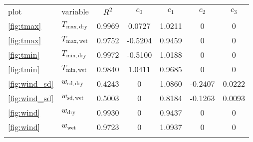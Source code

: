 \begin{tabular}{llccccc}
\tophline
              plot &                          variable &  $R^2$ &   $c_0$ &  $c_1$ &   $c_2$ &  $c_3$ \\
\middlehline
 \ref{fig:tmax} &  $T_{\mathrm{max}, \mathrm{dry}}$ & 0.9969 & 0.0727 & 1.0211 & 0 & 0 \\
 \ref{fig:tmax} &  $T_{\mathrm{max}, \mathrm{wet}}$ & 0.9752 & -0.5204 & 0.9459 & 0 & 0 \\
 \ref{fig:tmin} &  $T_{\mathrm{min}, \mathrm{dry}}$ & 0.9972 & -0.5100 & 1.0188 & 0 & 0 \\
 \ref{fig:tmin} &  $T_{\mathrm{min}, \mathrm{wet}}$ & 0.9840 & 1.0411 & 0.9685 & 0 & 0 \\
 \ref{fig:wind_sd} &  $w_{\mathrm{sd}, \mathrm{dry}}$ & 0.4243 & 0 & 1.0860 & -0.2407 & 0.0222 \\
 \ref{fig:wind_sd} &  $w_{\mathrm{sd}, \mathrm{wet}}$ & 0.5003 & 0 & 0.8184 & -0.1263 & 0.0093 \\
 \ref{fig:wind} &  $w_{\mathrm{dry}}$ & 0.9930 & 0 & 0.9437 & 0 & 0 \\
 \ref{fig:wind} &  $w_{\mathrm{wet}}$ & 0.9723 & 0 & 1.0937 & 0 & 0 \\
\bottomhline
\end{tabular}
